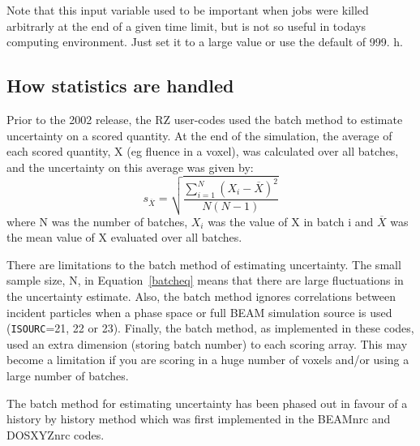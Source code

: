 \documentclass[12pt,twoside]{article}  %
\begin{document}
Note that this input variable used to be
important when jobs were killed arbitrarly at the end of a given time
limit, but is not so useful in todays computing environment. Just set it to
a large value or use the default of 999. h.

\subsection{How statistics are handled}
Prior to the 2002 release, the RZ user-codes used the batch method
to estimate uncertainty on a scored quantity.  At the end 
of the simulation, the average of each scored quantity, X (eg fluence in
a voxel), was calculated over all batches, and the uncertainty on this
average was given by:
\begin{equation}
s_{\overline{X}} = \sqrt{\frac{\sum_{i=1}^{N}(X_i-{\overline{X}})^2}{N(N-1)}}
\label{batcheq}
\end{equation}
where N was the number of batches, $X_i$ was the value of X in batch i and
$\overline{X}$ was the mean value of X evaluated over all batches.

There are limitations to the batch method of estimating uncertainty.  The
small sample size, N, in Equation~\ref{batcheq} means that there are large
fluctuations in the uncertainty estimate.   Also, the batch method ignores
correlations between incident particles when a phase space or full
BEAM simulation source 
is used ({\tt ISOURC}=21, 22 or 23).
Finally, the batch method, as implemented in these codes, used an extra 
dimension (storing
batch number) to each scoring array.  This may become a limitation if you
are scoring in a huge number of voxels and/or using a large number of batches.

The batch method for estimating uncertainty has been phased out
in favour of a history by history method which was first implemented in the
BEAMnrc and DOSXYZnrc codes\cite{Wa02a}.  
\end{document}
